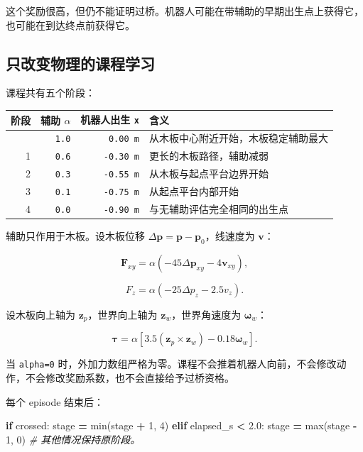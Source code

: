 \documentclass[
  chinese,
  11pt,
  letterpaper,
]{article}
\newenvironment{Shaded}{\begin{snugshade}}{\end{snugshade}}
\newcommand{\BuiltInTok}[1]{#1}
\newcommand{\CommentTok}[1]{\textcolor[rgb]{0.56,0.35,0.01}{\textit{#1}}}
\newcommand{\ControlFlowTok}[1]{\textcolor[rgb]{0.13,0.29,0.53}{\textbf{#1}}}
\newcommand{\DecValTok}[1]{\textcolor[rgb]{0.00,0.00,0.81}{#1}}
\newcommand{\FloatTok}[1]{\textcolor[rgb]{0.00,0.00,0.81}{#1}}
\newcommand{\NormalTok}[1]{#1}
\newcommand{\OperatorTok}[1]{\textcolor[rgb]{0.81,0.36,0.00}{\textbf{#1}}}
\newcounter{none} %
\renewenvironment{Shaded}{\par\smallskip}{\par\smallskip}
\begin{document}
这个奖励很高，但仍不能证明过桥。机器人可能在带辅助的早期出生点上获得它，也可能在到达终点前获得它。

\subsection{只改变物理的课程学习}\label{ux53eaux6539ux53d8ux7269ux7406ux7684ux8bfeux7a0bux5b66ux4e60}

课程共有五个阶段：

{\def\LTcaptype{none} %
\begin{longtable}[]{@{}rrrl@{}}
\toprule\noalign{}
阶段 & 辅助 \(\alpha\) & 机器人出生 \texttt{x} & 含义 \\
\midrule\noalign{}
\endhead
\bottomrule\noalign{}
\endlastfoot
0 & \texttt{1.0} & \texttt{0.00\ m} &
从木板中心附近开始，木板稳定辅助最大 \\
1 & \texttt{0.6} & \texttt{-0.30\ m} & 更长的木板路径，辅助减弱 \\
2 & \texttt{0.3} & \texttt{-0.55\ m} & 从木板与起点平台边界开始 \\
3 & \texttt{0.1} & \texttt{-0.75\ m} & 从起点平台内部开始 \\
4 & \texttt{0.0} & \texttt{-0.90\ m} & 与无辅助评估完全相同的出生点 \\
\end{longtable}
}

辅助只作用于木板。设木板位移
\(\Delta\mathbf p=\mathbf p-\mathbf p_0\)，线速度为 \(\mathbf v\)：

\[
\mathbf F_{xy}
=\alpha(-45\Delta\mathbf p_{xy}-4\mathbf v_{xy}),
\]

\[
F_z=\alpha(-25\Delta p_z-2.5v_z).
\]

设木板向上轴为 \(\mathbf z_p\)，世界向上轴为
\(\mathbf z_w\)，世界角速度为 \(\boldsymbol\omega_w\)：

\[
\boldsymbol\tau
=\alpha\left[
3.5(\mathbf z_p\times\mathbf z_w)
-0.18\boldsymbol\omega_w
\right].
\]

当 \texttt{alpha=0}
时，外加力数组严格为零。课程不会推着机器人向前，不会修改动作，不会修改奖励系数，也不会直接给予过桥资格。

每个 episode 结束后：

\begingroup\setmonofont{PingFang SC}

\begin{Shaded}
\begin{Highlighting}[]
\ControlFlowTok{if}\NormalTok{ crossed:}
\NormalTok{    stage }\OperatorTok{=} \BuiltInTok{min}\NormalTok{(stage }\OperatorTok{+} \DecValTok{1}\NormalTok{, }\DecValTok{4}\NormalTok{)}
\ControlFlowTok{elif}\NormalTok{ elapsed\_s }\OperatorTok{\textless{}} \FloatTok{2.0}\NormalTok{:}
\NormalTok{    stage }\OperatorTok{=} \BuiltInTok{max}\NormalTok{(stage }\OperatorTok{{-}} \DecValTok{1}\NormalTok{, }\DecValTok{0}\NormalTok{)}
\CommentTok{\# 其他情况保持原阶段。}
\end{Highlighting}
\end{Shaded}
\end{document}
